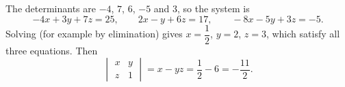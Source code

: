 The determinants are $-4$, $7$, $6$, $-5$ and $3$, so the system is
\[-4x+3y+7z=25,\qquad2x-y+6z=17,\qquad-8x-5y+3z=-5.\]
Solving (for example by elimination) gives $x=\dfrac12$, $y=2$, $z=3$, which satisfy all three equations. Then
\[\begin{vmatrix}x&y\\z&1\end{vmatrix}=x-yz=\dfrac12-6=\boxed{-\dfrac{11}{2}}.\]
